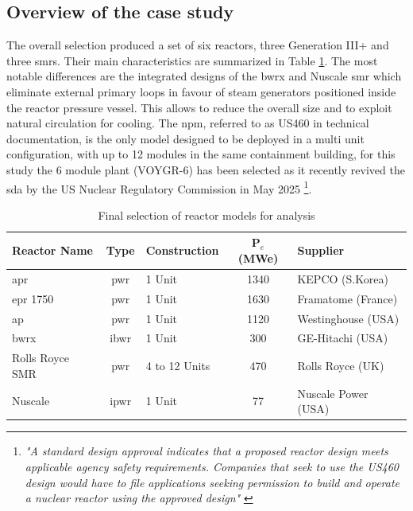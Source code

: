 \subsection{Overview of the case study}
The overall selection produced a set of six reactors, three Generation III+ and three \glspl{smr}. Their main characteristics are summarized in Table \ref{tab:final-reactor-selection}. The most notable differences are the integrated designs of the \gls{bwrx} and Nuscale \gls{smr} which eliminate external primary loops in favour of steam generators positioned inside the reactor pressure vessel. This allows to reduce the overall size and to exploit natural circulation for cooling. The \gls{npm}, referred to as US460 in technical documentation, is the only model designed to be deployed in a multi unit configuration, with up to 12 modules in the same containment building, for this study the 6 module plant (VOYGR-6) has been selected as it recently revived the \gls{sda} by the US Nuclear Regulatory Commission in May 2025 \footnote{\textit{"A standard design approval indicates that a proposed reactor design meets applicable agency safety requirements. Companies that seek to use the US460 design would have to file applications seeking permission to build and operate a nuclear reactor using the approved design"} \cite{NRC_2025_033}}.

\begin{table}[!hb]
\centering
\begin{tabularx}{\textwidth}{lclcX}
\toprule
\textbf{Reactor Name} & \textbf{Type} & \textbf{Construction} & \textbf{P$_e$ (MWe)} & \textbf{Supplier} \\
\midrule
\gls{apr} & \gls{pwr}  & 1 Unit & 1340 & KEPCO (S.Korea) \\
\gls{epr} 1750 & \gls{pwr}  & 1 Unit & 1630 & Framatome (France) \\
\gls{ap} & \gls{pwr}  & 1 Unit & 1120 & Westinghouse (USA) \\
\gls{bwrx} & \gls{ibwr} & 1 Unit & 300 & GE-Hitachi (USA)\\
Rolls Royce SMR & \gls{pwr}  & 4 to 12 Units & 470 & Rolls Royce (UK) \\
Nuscale & \gls{ipwr} & 1 Unit & 77 & Nuscale Power (USA) \\
\bottomrule
\end{tabularx}
\caption{Final selection of reactor models for analysis}
\label{tab:final-reactor-selection}
\end{table}

